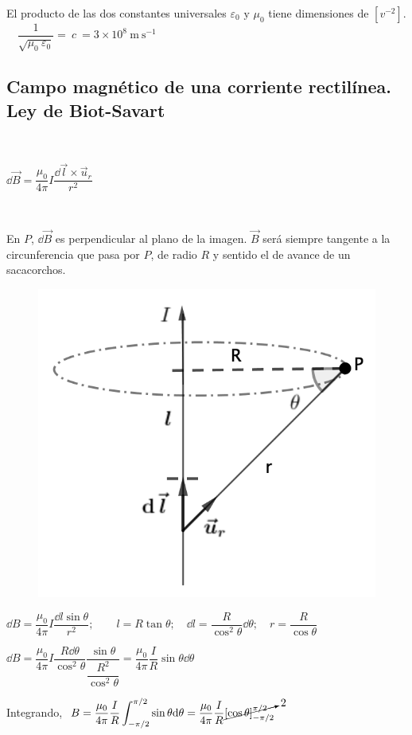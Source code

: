 El producto de las dos constantes universales $\varepsilon_0 \text{ y } \mu_0$ tiene dimensiones de $[v^{-2}]$. 
$\quad \dfrac 1 {\sqrt{\mu_0 \ \varepsilon_0} } = \ c \ = 3\times 10^8\ \mathrm{m\ s}^{-1}$

\subsection{Campo magnético de una corriente rectilínea. Ley de Biot-Savart}

\begin{multicols}{2}

$\quad$

$\dd \vec B=\dfrac{\mu_0}{4\pi} I \dfrac{\dd \vec l \times \vec u_r}{r^2} $

$\quad$

En $P$, $\dd \vec B$ es perpendicular al plano de la imagen. $\vec B$ será siempre tangente a la circunferencia que pasa por $P$, de radio $R$ y sentido el de avance de un sacacorchos.
	\begin{figure}[H]
	\centering
	\includegraphics[width=.5\textwidth]{imagenes/imagenes26/T26IM05.png}
	\end{figure}	
\end{multicols}

$\dd B=\dfrac{\mu_0}{4\pi} I \dfrac{\dd l \sin \theta}{r^2};\qquad l=R\tan \theta; \quad \dd l=\dfrac {R}{\cos^2 \theta} \dd \theta; \quad r=\dfrac {R}{\cos \theta}$

$\dd B= \dfrac {\mu_0}{4\pi} I \dfrac{R \dd \theta}{\cos^2 \theta} \dfrac {\sin \theta}{\dfrac{R^2}{\cos^2 \theta}}= \dfrac {\mu_0}{4\pi} \dfrac I R \sin \theta \dd \theta$

Integrando, $\ \displaystyle B= \dfrac {\mu_0}{4\pi} \dfrac I R \int_{-\pi/2}^{\pi/2} \sin \theta \dd \theta =  \dfrac {\mu_0}{4\pi}  \dfrac I R 
\cancelto{2}{
\left[ \cos \theta \right]_{-\pi/2}^{\pi/2}}$




